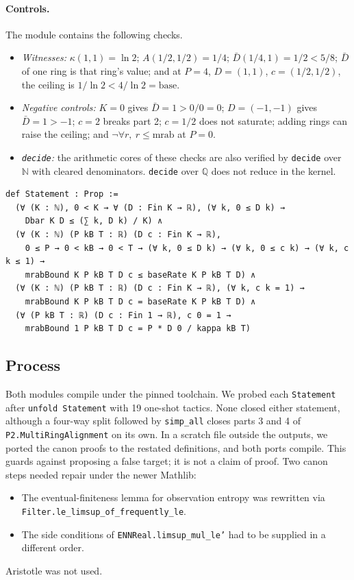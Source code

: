 \documentclass[11pt]{article}
\theoremstyle{definition}
\theoremstyle{remark}
\begin{document}
\paragraph{Controls.} The module contains the following checks.
\begin{itemize}
\item \emph{Witnesses:} $\kappa(1,1)=\ln 2$; $A(1/2,1/2)=1/4$; $\bar D(1/4,1)=1/2<5/8$; $\bar D$ of one ring is that ring's
value; and at $P=4$, $D=(1,1)$, $c=(1/2,1/2)$, the ceiling is $1/\ln2<4/\ln2=\mathrm{base}$.
\item \emph{Negative controls:} $K=0$ gives $\bar D=1>0/0=0$; $D=(-1,-1)$ gives $\bar D=1>-1$; $c=2$ breaks part 2;
$c=1/2$ does not saturate; adding rings can raise the ceiling; and $\neg\forall r,\ r\le\mathrm{mrab}$ at $P=0$.
\item \emph{\texttt{decide}:} the arithmetic cores of these checks are also verified by \texttt{decide} over $\mathbb{N}$
with cleared denominators. \texttt{decide} over $\mathbb{Q}$ does not reduce in the kernel.
\end{itemize}
\begin{lstlisting}
def Statement : Prop :=
  (∀ (K : ℕ), 0 < K → ∀ (D : Fin K → ℝ), (∀ k, 0 ≤ D k) →
    Dbar K D ≤ (∑ k, D k) / K) ∧
  (∀ (K : ℕ) (P kB T : ℝ) (D c : Fin K → ℝ),
    0 ≤ P → 0 < kB → 0 < T → (∀ k, 0 ≤ D k) → (∀ k, 0 ≤ c k) → (∀ k, c k ≤ 1) →
    mrabBound K P kB T D c ≤ baseRate K P kB T D) ∧
  (∀ (K : ℕ) (P kB T : ℝ) (D c : Fin K → ℝ), (∀ k, c k = 1) →
    mrabBound K P kB T D c = baseRate K P kB T D) ∧
  (∀ (P kB T : ℝ) (D c : Fin 1 → ℝ), c 0 = 1 →
    mrabBound 1 P kB T D c = P * D 0 / kappa kB T)
\end{lstlisting}

\subsection{Process}
Both modules compile under the pinned toolchain. We probed each \texttt{Statement} after \texttt{unfold Statement} with 19
one-shot tactics. None closed either statement, although a four-way split followed by \texttt{simp\_all} closes parts 3 and 4
of \texttt{P2.MultiRingAlignment} on its own. In a scratch file outside the outputs, we ported the canon proofs to the
restated definitions, and both ports compile. This guards against proposing a false target; it is not a claim of proof.
Two canon steps needed repair under the newer Mathlib:
\begin{itemize}
\item The eventual-finiteness lemma for observation entropy was rewritten via \texttt{Filter.le\_limsup\_of\_frequently\_le}.
\item The side conditions of \texttt{ENNReal.limsup\_mul\_le'} had to be supplied in a different order.
\end{itemize}
Aristotle was not used.
\end{document}
